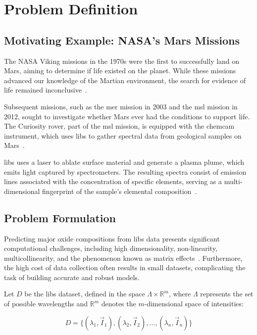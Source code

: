 \section{Problem Definition}\label{sec:problem_definition}

\subsection{Motivating Example: NASA's Mars Missions}
The NASA Viking missions in the 1970s were the first to successfully land on Mars, aiming to determine if life existed on the planet. 
While these missions advanced our knowledge of the Martian environment, the search for evidence of life remained inconclusive~\cite{marsnasagov_vikings}.

Subsequent missions, such as the \gls{mer} mission in 2003 and the \gls{msl} mission in 2012, sought to investigate whether Mars ever had the conditions to support life. 
The Curiosity rover, part of the \gls{msl} mission, is equipped with the \gls{chemcam} instrument, which uses \gls{libs} to gather spectral data from geological samples on Mars~\cite{wiensChemcam2012}.

\gls{libs} uses a laser to ablate surface material and generate a plasma plume, which emits light captured by spectrometers. 
The resulting spectra consist of emission lines associated with the concentration of specific elements, serving as a multi-dimensional fingerprint of the sample's elemental composition~\cite{cleggRecalibrationMarsScience2017}.

\subsection{Problem Formulation}
Predicting major oxide compositions from \gls{libs} data presents significant computational challenges, including high dimensionality, non-linearity, multicollinearity, and the phenomenon known as matrix effects~\cite{andersonImprovedAccuracyQuantitative2017}.
Furthermore, the high cost of data collection often results in small datasets, complicating the task of building accurate and robust models.

Let $D$ be the \gls{libs} dataset, defined in the space $\Lambda \times \mathbb{R}^m$, where $\Lambda$ represents the set of possible wavelengths and $\mathbb{R}^m$ denotes the $m$-dimensional space of intensities:

\begin{equation}
D = \{ (\lambda_1, \vec{I}_1), (\lambda_2, \vec{I}_2), \ldots, (\lambda_n, \vec{I}_n) \}    
\end{equation}

